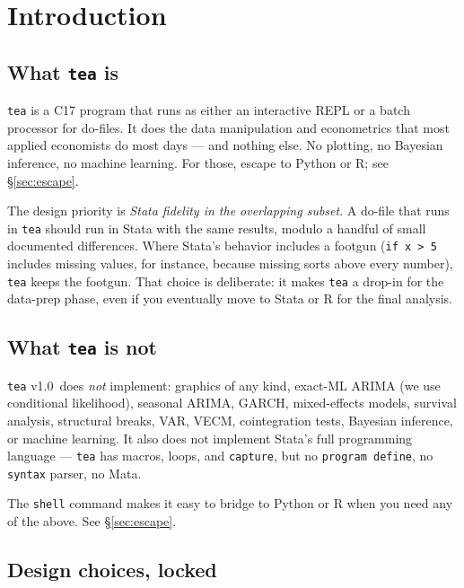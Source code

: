 \documentclass[11pt,letterpaper]{article}
\newcommand{\teaversion}{1.0}
\begin{document}
\newpage
\tableofcontents
\newpage

\section{Introduction}

\subsection{What \texttt{tea} is}

\texttt{tea} is a C17 program that runs as either an interactive REPL or
a batch processor for do-files.  It does the data manipulation and
econometrics that most applied economists do most days — and nothing
else.  No plotting, no Bayesian inference, no machine learning.  For
those, escape to Python or R; see \S\ref{sec:escape}.

The design priority is \emph{Stata fidelity in the overlapping subset}.
A do-file that runs in \texttt{tea} should run in Stata with the same
results, modulo a handful of small documented differences.  Where
Stata's behavior includes a footgun (\texttt{if x > 5} includes missing
values, for instance, because missing sorts above every number),
\texttt{tea} keeps the footgun.  That choice is deliberate: it makes
\texttt{tea} a drop-in for the data-prep phase, even if you eventually
move to Stata or R for the final analysis.

\subsection{What \texttt{tea} is not}

\texttt{tea} v\teaversion\ does \emph{not} implement: graphics of any
kind, exact-ML ARIMA (we use conditional likelihood), seasonal ARIMA,
GARCH, mixed-effects models, survival analysis, structural breaks, VAR,
VECM, cointegration tests, Bayesian inference, or machine learning.  It
also does not implement Stata's full programming language — \texttt{tea}
has macros, loops, and \texttt{capture}, but no \texttt{program define},
no \texttt{syntax} parser, no Mata.

The \texttt{shell} command makes it easy to bridge to Python or R when
you need any of the above.  See \S\ref{sec:escape}.

\subsection{Design choices, locked}
\end{document}
